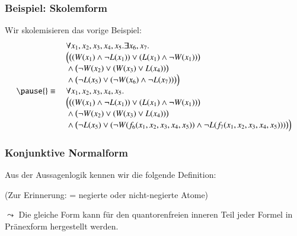 \documentclass[aspectratio=1610,onlymath]{beamer}
\begin{document}
\begin{frame}\frametitle{Beispiel: Skolemform}

Wir skolemisieren das vorige Beispiel:
\[\begin{array}{rl}
& \forall x_1,x_2,x_3,x_4,x_5.\exists x_6,x_7.\\
& \Big(\big((W(x_1)\wedge\neg L(x_1))\vee (L(x_1)\wedge\neg W(x_1))\big)\\
& {}\wedge{}  \big(\neg W(x_2)\vee(W(x_3) \vee L(x_4))\big)\\
& {}\wedge{}  \big(\neg L(x_5)\vee(\neg W(x_6) \wedge \neg L(x_7))\big)\Big)\\\pause
{}\equiv{} & \forall x_1,x_2,x_3,x_4,x_5.\\
& \Big(\big((W(x_1)\wedge\neg L(x_1))\vee (L(x_1)\wedge\neg W(x_1))\big)\\
& {}\wedge{}  \big(\neg W(x_2)\vee(W(x_3) \vee L(x_4))\big)\\
& {}\wedge{}  \big(\neg L(x_5)\vee(\neg W(f_6(x_1,x_2,x_3,x_4,x_5)) \wedge \neg L(f_7(x_1,x_2,x_3,x_4,x_5)))\big)\Big)
\end{array}
\]


\end{frame}


\begin{frame}\frametitle{Konjunktive Normalform}

Aus der Aussagenlogik kennen wir die folgende Definition:
\bigskip

\medskip

(Zur Erinnerung:  = negierte oder nicht-negierte Atome)
\bigskip

$\leadsto$ Die gleiche Form kann für den quantorenfreien inneren Teil jeder Formel in Pränexform hergestellt werden.

\end{frame}
\end{document}
